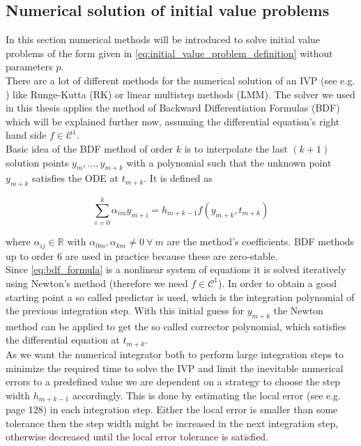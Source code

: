 \documentclass{scrartcl}[12pt, halfparskip]
\numberwithin{equation}{section}
\numberwithin{figure}{section}
\numberwithin{table}{section}
\begin{document}
\subsection{Numerical solution of initial value problems}
\label{sec:theory_ODE_solver_BDF}

In this section numerical methods will be introduced to solve initial value problems of the form given in \cref{eq:initial_value_problem_definition} without parameters $p$. \\ 
There are a lot of different methods for the numerical solution of an IVP (see e.g. \cite{diff_equations_numerics}) like Runge-Kutta (RK) or linear multistep methods (LMM). The solver we used in this thesis applies the method of Backward Differentiation Formulas (BDF) which will be explained further now, assuming the differential equation's right hand side $f \in \mathcal{C}^1$. \\
Basic idea of the BDF method of order $k$ is to interpolate the last $(k+1)$ solution points $y_m,...,y_{m+k}$ with a polynomial such that the unknown point $y_{m+k}$ satisfies the ODE at $t_{m+k}$. 
It is defined as

\begin{equation}
	\sum_{i=0}^{k} \alpha_{im} y_{m+i} = h_{m+k-1} f(y_{m+k},t_{m+k})
	\label{eq:bdf_formula}
\end{equation}

where $\alpha_{ij} \in \mathbb{R}$ with $\alpha_{0m},\alpha_{km} \ne 0 \ \forall \ m$ are the method's coefficients. BDF methods up to order 6 are used in practice because these are zero-stable. \\
Since \cref{eq:bdf_formula} is a nonlinear system of equations it is solved iteratively using Newton's method (therefore we need $f \in \mathcal{C}^1$). In order to obtain a good starting point a so called predictor is used, which is the integration polynomial of the previous integration step. With this initial guess for $y_{m+k}$ the Newton method can be applied to get the so called corrector polynomial, which satisfies the differential equation at $t_{m+k}$. \\
As we want the numerical integrator both to perform large integration steps to minimize the required time to solve the IVP and limit the inevitable numerical errors to a predefined value we are dependent on a strategy to choose the step width $h_{m+k-1}$ accordingly. This is done by estimating the local error (see e.g. \cite{diss_jan} page 128) in each integration step. Either the local error is smaller than some tolerance then the step width might be increased in the next integration step, otherwise decreased until the local error tolerance is satisfied. \\
\end{document}
